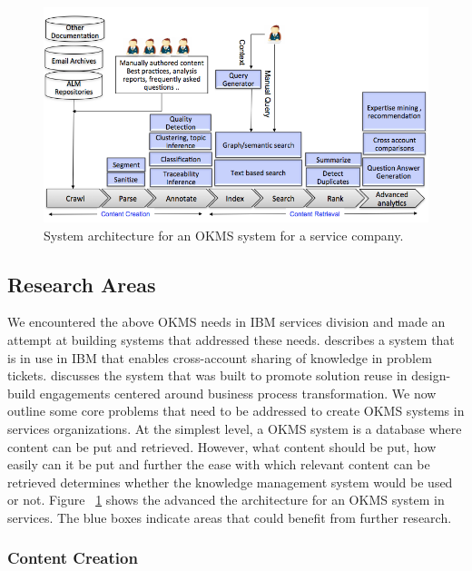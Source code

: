 \begin{figure}
	\center
	\includegraphics[scale=0.45]{figs/km.png}
        \vspace*{-10pt}
	\caption{System architecture for an OKMS system for a service company.}
        \vspace*{-10pt}
	\label{fig-km}
\end{figure}


\subsection{Research Areas}

We encountered the above OKMS needs in IBM services division and made an attempt at building systems that addressed these needs. \cite{Majumdar:2011} describes a system that is in use in IBM that enables cross-account sharing of knowledge in problem tickets. \cite{Goodwin:2012b} discusses the system that was built to promote solution reuse in design-build engagements centered around business process transformation. We now outline some core problems that need to be addressed to create OKMS systems in services organizations. At the simplest level, a OKMS system is a database where content can be put and retrieved. However, what content should be put, how easily can it be put and further the ease with which relevant content can be retrieved determines whether the knowledge management system would be used or not. 
Figure ~\ref{fig-km} shows the advanced the architecture for an OKMS system in services. The blue boxes indicate areas that could benefit from further research. 

\subsubsection{Content Creation}

